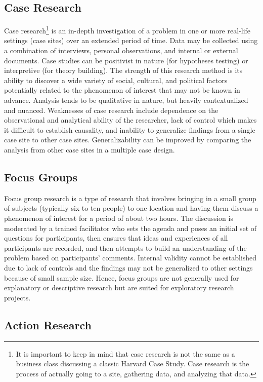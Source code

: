 \subsection{Case Research}

Case research\footnote{It is important to keep in mind that case research is not the same as a business class discussing a classic Harvard Case Study. Case research is the process of actually going to a site, gathering data, and analyzing that data.} is an in-depth investigation of a problem in one or more real-life settings (case sites) over an extended period of time. Data may be collected using a combination of interviews, personal observations, and internal or external documents. Case studies can be positivist in nature (for hypotheses testing) or interpretive (for theory building). The strength of this research method is its ability to discover a wide variety of social, cultural, and political factors potentially related to the phenomenon of interest that may not be known in advance. Analysis tends to be qualitative in nature, but heavily contextualized and nuanced. Weaknesses of case research include dependence on the observational and analytical ability of the researcher, lack of control which makes it difficult to establish causality, and inability to generalize findings from a single case site to other case sites. Generalizability can be improved by comparing the analysis from other case sites in a multiple case design.

\subsection{Focus Groups}

Focus group research is a type of research that involves bringing in a small group of subjects (typically six to ten people) to one location and having them discuss a phenomenon of interest for a period of about two hours. The discussion is moderated by a trained facilitator who sets the agenda and poses an initial set of questions for participants, then ensures that ideas and experiences of all participants are recorded, and then attempts to build an understanding of the problem based on participants' comments. Internal validity cannot be established due to lack of controls and the findings may not be generalized to other settings because of small sample size. Hence, focus groups are not generally used for explanatory or descriptive research but are suited for exploratory research projects.

\subsection{Action Research}

